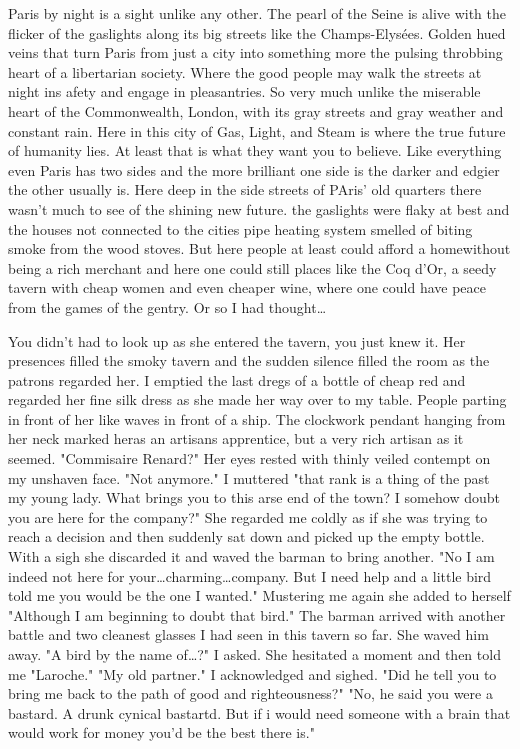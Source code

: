 Paris by night is a sight unlike any other. The pearl of the Seine is alive with the flicker of the gaslights along its big streets like the Champs-Elys\'{e}es. Golden hued veins that turn Paris from just a city into something more the pulsing throbbing heart of a libertarian society. Where the good people may walk the streets at night ins afety and engage in pleasantries. So very much unlike the miserable heart of the Commonwealth, London, with its gray streets and gray weather and constant rain. Here in this city of Gas, Light, and Steam is where the true future of humanity lies. At least that is what they want you to believe. Like everything even Paris has two sides and the more brilliant one side is the darker and edgier the other usually is. Here deep in the side streets of PAris' old quarters there wasn't much to see of the shining new future. the gaslights were flaky at best and the houses not connected to the cities pipe heating system smelled of biting smoke from the wood stoves. But here people at least could afford a homewithout being a rich merchant and here one could still places like the Coq d'Or, a seedy tavern with cheap women and even cheaper wine, where one could have peace from the games of the gentry. Or so I had thought\dots

\newscene

You didn't had to look up as she entered the tavern, you just knew it. Her presences filled the smoky tavern and the sudden silence filled the room as the patrons regarded her. I emptied the last dregs of a bottle of cheap red and regarded her fine silk dress as she made her way over to my table. People parting in front of her like waves in front of a ship. The clockwork pendant hanging from her neck marked heras an artisans apprentice, but a very rich artisan as it seemed. "Commisaire Renard?" Her eyes rested with thinly veiled contempt on my unshaven face. "Not anymore." I muttered "that rank is a thing of the past my young lady. What brings you to this arse end of the town? I somehow doubt you are here for the company?" She regarded me coldly as if she was trying to reach a decision and then suddenly sat down and picked up the empty bottle. With a sigh she discarded it and waved the barman to bring another. "No I am indeed not here for your\dots charming\dots company. But I need help and a little bird told me you would be the one I wanted." Mustering me again she added to herself "Although I am beginning to doubt that bird." The barman arrived with another battle and two cleanest glasses I had seen in this tavern so far. She waved him away. "A bird by the name of\dots?" I asked. She hesitated a moment and then told me "Laroche." "My old partner." I acknowledged and sighed. "Did he tell you to bring me back to the path of good and righteousness?" "No, he said you were a bastard. A drunk cynical bastartd. But if i would need someone with a brain that would work for money you'd be the best there is."
